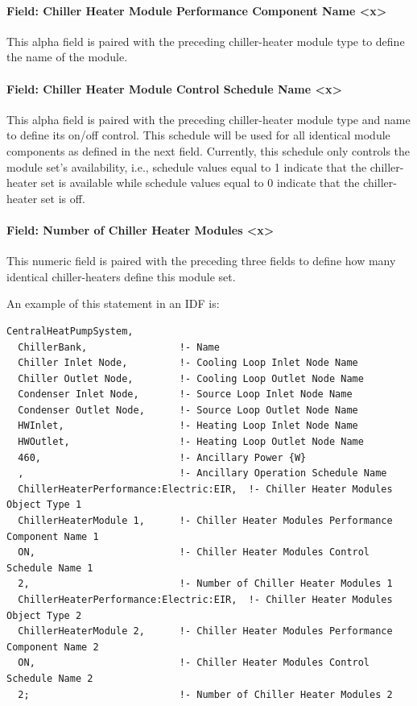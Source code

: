 \paragraph{Field: Chiller Heater Module Performance Component Name \textless{}x\textgreater{}}\label{field-chiller-heater-module-performance-component-name-x}

This alpha field is paired with the preceding chiller-heater module type to define the name of the module.

\paragraph{Field: Chiller Heater Module Control Schedule Name \textless{}x\textgreater{}}\label{field-chiller-heater-module-control-schedule-name-x}

This alpha field is paired with the preceding chiller-heater module type and name to define its on/off control. This schedule will be used for all identical module components as defined in the next field. Currently, this schedule only controls the module set's availability, i.e., schedule values equal to 1 indicate that the chiller-heater set is available while schedule values equal to 0 indicate that the chiller-heater set is off.

\paragraph{Field: Number of Chiller Heater Modules \textless{}x\textgreater{}}\label{field-number-of-chiller-heater-modules-x}

This numeric field is paired with the preceding three fields to define how many identical chiller-heaters define this module set.

An example of this statement in an IDF is:

\begin{lstlisting}
CentralHeatPumpSystem,
  ChillerBank,                !- Name
  Chiller Inlet Node,         !- Cooling Loop Inlet Node Name
  Chiller Outlet Node,        !- Cooling Loop Outlet Node Name
  Condenser Inlet Node,       !- Source Loop Inlet Node Name
  Condenser Outlet Node,      !- Source Loop Outlet Node Name
  HWInlet,                    !- Heating Loop Inlet Node Name
  HWOutlet,                   !- Heating Loop Outlet Node Name
  460,                        !- Ancillary Power {W}
  ,                           !- Ancillary Operation Schedule Name
  ChillerHeaterPerformance:Electric:EIR,  !- Chiller Heater Modules Object Type 1
  ChillerHeaterModule 1,      !- Chiller Heater Modules Performance Component Name 1
  ON,                         !- Chiller Heater Modules Control Schedule Name 1
  2,                          !- Number of Chiller Heater Modules 1
  ChillerHeaterPerformance:Electric:EIR,  !- Chiller Heater Modules Object Type 2
  ChillerHeaterModule 2,      !- Chiller Heater Modules Performance Component Name 2
  ON,                         !- Chiller Heater Modules Control Schedule Name 2
  2;                          !- Number of Chiller Heater Modules 2
\end{lstlisting}

